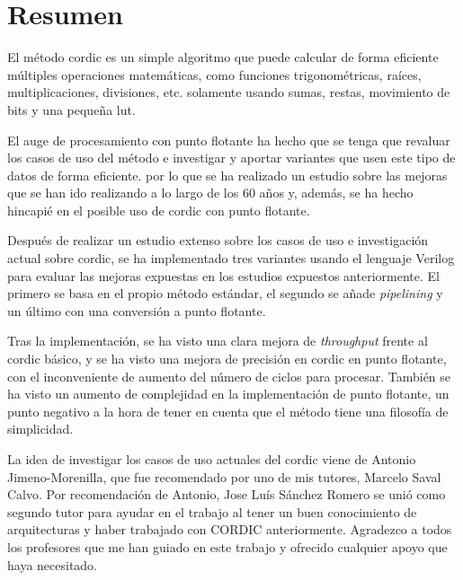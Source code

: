 

\chapter*{Resumen}
\thispagestyle{empty}
El método \gls{cordic} es un simple algoritmo que puede calcular de forma eficiente múltiples operaciones matemáticas, como funciones trigonométricas, raíces, multiplicaciones, divisiones, etc. solamente usando sumas, restas, movimiento de bits y una pequeña \gls{lut}.

El auge de procesamiento con punto flotante ha hecho que se tenga que revaluar los casos de uso del método e investigar y aportar variantes que usen este tipo de datos de forma eficiente. por lo que se ha realizado un estudio sobre las mejoras que se han ido realizando a lo largo de los 60 años y, además, se ha hecho hincapié en el posible uso de \gls{cordic} con punto flotante. 

Después de realizar un estudio extenso sobre los casos de uso e investigación actual sobre \gls{cordic}, se ha implementado tres variantes usando el lenguaje Verilog para evaluar las mejoras expuestas en los estudios expuestos anteriormente. El primero se basa en el propio método estándar, el segundo se añade \textit{pipelining} y un último con una conversión a punto flotante.

Tras la implementación, se ha visto una clara mejora de \textit{throughput} frente al \gls{cordic} básico, y se ha visto una mejora de precisión en \gls{cordic} en punto flotante, con el inconveniente de aumento del número de ciclos para procesar. También se ha visto un aumento de complejidad en la implementación de punto flotante, un punto negativo a la hora de tener en cuenta que el método tiene una filosofía de simplicidad.

La idea de investigar los casos de uso actuales del \gls{cordic} viene de Antonio Jimeno-Morenilla, que fue recomendado por uno de mis tutores, Marcelo Saval Calvo. Por recomendación de Antonio, Jose Luís Sánchez Romero se unió como segundo tutor para ayudar en el trabajo al tener un buen conocimiento de arquitecturas y haber trabajado con CORDIC anteriormente. Agradezco a todos los profesores que me han guiado en este trabajo y ofrecido cualquier apoyo que haya necesitado.



